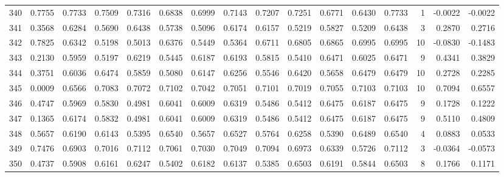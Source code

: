 \begin{tabular}{lrrrrrrrrrrrrrrr}
340 &      0.7755 &  0.7733 &  0.7509 &  0.7316 &  0.6838 &  0.6999 &  0.7143 &  0.7207 &  0.7251 &  0.6771 &   0.6430 &     0.7733 &      1 &                   -0.0022 &                    -0.0022 \\
341 &      0.3568 &  0.6284 &  0.5690 &  0.6438 &  0.5738 &  0.5096 &  0.6174 &  0.6157 &  0.5219 &  0.5827 &   0.5209 &     0.6438 &      3 &                    0.2870 &                     0.2716 \\
342 &      0.7825 &  0.6342 &  0.5198 &  0.5013 &  0.6376 &  0.5449 &  0.5364 &  0.6711 &  0.6805 &  0.6865 &   0.6995 &     0.6995 &     10 &                   -0.0830 &                    -0.1483 \\
343 &      0.2130 &  0.5959 &  0.5197 &  0.6219 &  0.5445 &  0.6187 &  0.6193 &  0.5815 &  0.5410 &  0.6471 &   0.6025 &     0.6471 &      9 &                    0.4341 &                     0.3829 \\
344 &      0.3751 &  0.6036 &  0.6474 &  0.5859 &  0.5080 &  0.6147 &  0.6256 &  0.5546 &  0.6420 &  0.5658 &   0.6479 &     0.6479 &     10 &                    0.2728 &                     0.2285 \\
345 &      0.0009 &  0.6566 &  0.7083 &  0.7072 &  0.7102 &  0.7042 &  0.7051 &  0.7101 &  0.7019 &  0.7055 &   0.7103 &     0.7103 &     10 &                    0.7094 &                     0.6557 \\
346 &      0.4747 &  0.5969 &  0.5830 &  0.4981 &  0.6041 &  0.6009 &  0.6319 &  0.5486 &  0.5412 &  0.6475 &   0.6187 &     0.6475 &      9 &                    0.1728 &                     0.1222 \\
347 &      0.1365 &  0.6174 &  0.5832 &  0.4981 &  0.6041 &  0.6009 &  0.6319 &  0.5486 &  0.5412 &  0.6475 &   0.6187 &     0.6475 &      9 &                    0.5110 &                     0.4809 \\
348 &      0.5657 &  0.6190 &  0.6143 &  0.5395 &  0.6540 &  0.5657 &  0.6527 &  0.5764 &  0.6258 &  0.5390 &   0.6489 &     0.6540 &      4 &                    0.0883 &                     0.0533 \\
349 &      0.7476 &  0.6903 &  0.7016 &  0.7112 &  0.7061 &  0.7030 &  0.7049 &  0.7094 &  0.6973 &  0.6339 &   0.5726 &     0.7112 &      3 &                   -0.0364 &                    -0.0573 \\
350 &      0.4737 &  0.5908 &  0.6161 &  0.6247 &  0.5402 &  0.6182 &  0.6137 &  0.5385 &  0.6503 &  0.6191 &   0.5844 &     0.6503 &      8 &                    0.1766 &                     0.1171 \\

\end{tabular}
